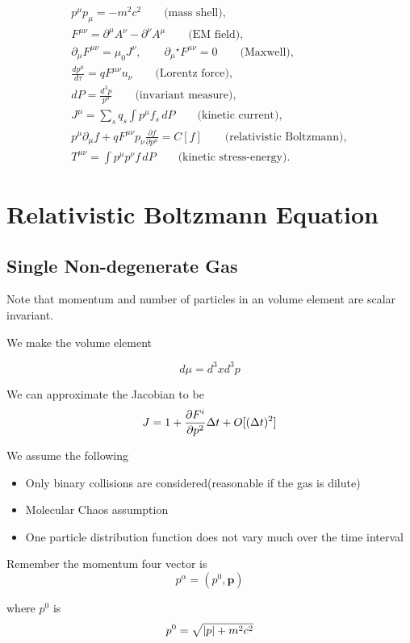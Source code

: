   \[
\begin{gathered}
p^\mu p_\mu=-m^2c^2
\qquad\text{(mass shell)},\\
F^{\mu\nu}=\partial^\mu A^\nu-\partial^\nu A^\mu
\qquad\text{(EM field)},\\
\partial_\mu F^{\mu\nu}=\mu_0J^\nu,\qquad
\partial_\mu{}^\star F^{\mu\nu}=0
\qquad\text{(Maxwell)},\\
\frac{dp^\mu}{d\tau}=qF^{\mu\nu}u_\nu
\qquad\text{(Lorentz force)},\\
dP=\frac{d^3p}{p^0}
\qquad\text{(invariant measure)},\\
J^\mu=\sum_s q_s\int p^\mu f_s\,dP
\qquad\text{(kinetic current)},\\
p^\mu\partial_\mu f
+qF^{\mu\nu}p_\nu\frac{\partial f}{\partial p^\mu}
=C[f]
\qquad\text{(relativistic Boltzmann)},\\
T^{\mu\nu}=\int p^\mu p^\nu f\,dP
\qquad\text{(kinetic stress-energy)}.
\end{gathered}
\]

\section{Relativistic Boltzmann Equation}
\subsection{Single Non-degenerate Gas}

Note that momentum and number of particles in an volume element are scalar invariant.

We make the volume element

\[
d \mu = d^3xd^3p
  \]

  We can approximate the Jacobian to be
\[
J = 1 + \pdv{F^i}{p^2} \Delta t + O[(\Delta t)^2]
  \]

  We assume the following
  \begin{itemize}
    \item Only binary collisions are considered(reasonable if the gas is dilute)
    \item Molecular Chaos assumption
          \item One particle distribution function does not vary much over the time interval
  \end{itemize}

  Remember the momentum four vector is
\[
p^\alpha = (p^0, \mathbf{p})
  \]

  where $p^0$ is
\[
p^0 = \sqrt{\abs{p}+m^2c^2}
  \]

